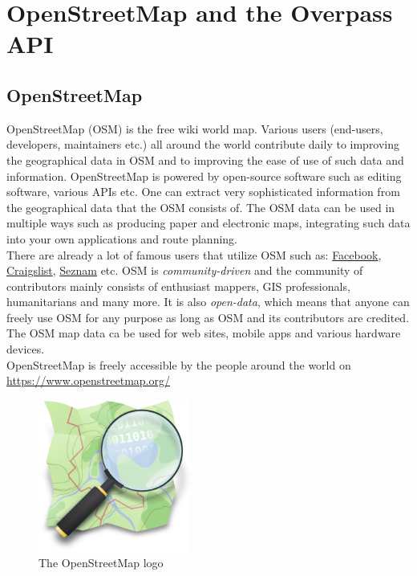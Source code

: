 \section{OpenStreetMap and the Overpass API}
\subsection{OpenStreetMap}
OpenStreetMap (OSM) is the free wiki world map. Various users (end-users, developers, maintainers etc.) all around the world contribute daily to improving the geographical data in OSM and to improving the ease of use of such data and information.
OpenStreetMap is powered by open-source software such as editing software, various APIs etc.
One can extract very sophisticated information from the geographical data that the OSM consists of.
The OSM data can be used in multiple ways such as producing paper and electronic maps,
integrating such data into your own applications and route planning.\\
\newline
There are already a lot of famous users that utilize OSM such as:
\href{https://www.facebook.com/}{Facebook},
\href{https://www.craigslist.org/}{Craigslist}, \href{https://www.seznam.cz/}{Seznam} etc.
OSM is \textit{community-driven} and the community of contributors mainly consists of enthusiast mappers,
GIS professionals, humanitarians and many more. It is also \textit{open-data}, which means that anyone can freely use
OSM for any purpose as long as OSM and its contributors are credited.
The OSM map data ca be used for web sites, mobile apps and various hardware devices.\\
\newline
OpenStreetMap is freely accessible by the people around the world on \href{https://www.openstreetmap.org/}{https://www.openstreetmap.org/}\\
\newline
\begin{figure}[H]
    \centering
    \includegraphics[width=5cm]{./Figures/Introduction/openstreetmap_logo}
    \caption{The OpenStreetMap logo}
\end{figure}
\pagebreak
